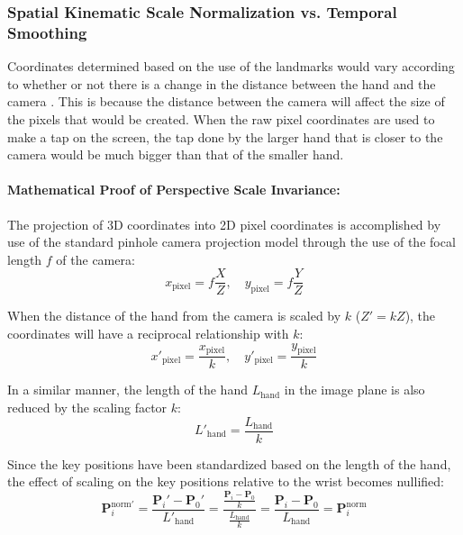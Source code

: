 \subsubsection{Spatial Kinematic Scale Normalization vs. Temporal Smoothing}
Coordinates determined based on the use of the landmarks would vary according to whether or not there is a change in the distance between the hand and the camera \cite{Doan2022Efficient, Kumar2026Hybrid}. This is because the distance between the camera will affect the size of the pixels that would be created. When the raw pixel coordinates are used to make a tap on the screen, the tap done by the larger hand that is closer to the camera would be much bigger than that of the smaller hand.

\paragraph{Mathematical Proof of Perspective Scale Invariance:}
The projection of 3D coordinates into 2D pixel coordinates is accomplished by use of the standard pinhole camera projection model through the use of the focal length $f$ of the camera:
\begin{equation}
x_{\text{pixel}} = f \frac{X}{Z}, \quad y_{\text{pixel}} = f \frac{Y}{Z}
\label{eq:pinhole_projection}
\end{equation}

When the distance of the hand from the camera is scaled by $k$ ($Z' = k Z$), the coordinates will have a reciprocal relationship with $k$:
\begin{equation}
x'_{\text{pixel}} = \frac{x_{\text{pixel}}}{k}, \quad y'_{\text{pixel}} = \frac{y_{\text{pixel}}}{k}
\label{eq:pixel_scaling}
\end{equation}

In a similar manner, the length of the hand $L_{\text{hand}}$ in the image plane is also reduced by the scaling factor $k$:
\begin{equation}
L'_{\text{hand}} = \frac{L_{\text{hand}}}{k}
\label{eq:hand_length_scaling}
\end{equation}

Since the key positions have been standardized based on the length of the hand, the effect of scaling on the key positions relative to the wrist becomes nullified:
\begin{equation}
\mathbf{P}_i^{\text{norm}\prime} = \frac{\mathbf{P}_i' - \mathbf{P}_0'}{L'_{\text{hand}}} = \frac{\frac{\mathbf{P}_i - \mathbf{P}_0}{k}}{\frac{L_{\text{hand}}}{k}} = \frac{\mathbf{P}_i - \mathbf{P}_0}{L_{\text{hand}}} = \mathbf{P}_i^{\text{norm}}
\label{eq:scale_invariance_proof}
\end{equation}

